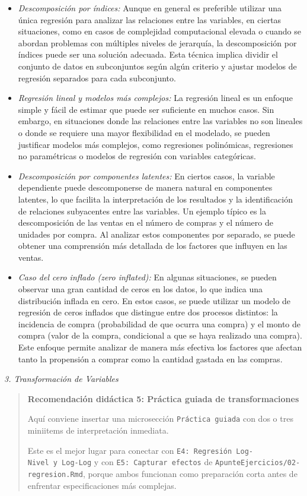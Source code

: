 \documentclass[
]{book}
\begin{document}
\begin{itemize}
\item
  \emph{Descomposición por índices:} Aunque en general es preferible
  utilizar una única regresión para analizar las relaciones entre las
  variables, en ciertas situaciones, como en casos de complejidad
  computacional elevada o cuando se abordan problemas con múltiples
  niveles de jerarquía, la descomposición por índices puede ser una
  solución adecuada. Esta técnica implica dividir el conjunto de datos
  en subconjuntos según algún criterio y ajustar modelos de regresión
  separados para cada subconjunto.
\item
  \emph{Regresión lineal y modelos más complejos:} La regresión lineal es
  un enfoque simple y fácil de estimar que puede ser suficiente en
  muchos casos. Sin embargo, en situaciones donde las relaciones entre
  las variables no son lineales o donde se requiere una mayor
  flexibilidad en el modelado, se pueden justificar modelos más
  complejos, como regresiones polinómicas, regresiones no paramétricas
  o modelos de regresión con variables categóricas.
\item
  \emph{Descomposición por componentes latentes:} En ciertos casos, la
  variable dependiente puede descomponerse de manera natural en
  componentes latentes, lo que facilita la interpretación de los
  resultados y la identificación de relaciones subyacentes entre las
  variables. Un ejemplo típico es la descomposición de las ventas en
  el número de compras y el número de unidades por compra. Al analizar
  estos componentes por separado, se puede obtener una comprensión más
  detallada de los factores que influyen en las ventas.
\item
  \emph{Caso del cero inflado (zero inflated):} En algunas situaciones, se
  pueden observar una gran cantidad de ceros en los datos, lo que
  indica una distribución inflada en cero. En estos casos, se puede
  utilizar un modelo de regresión de ceros inflados que distingue
  entre dos procesos distintos: la incidencia de compra (probabilidad
  de que ocurra una compra) y el monto de compra (valor de la compra,
  condicional a que se haya realizado una compra). Este enfoque
  permite analizar de manera más efectiva los factores que afectan
  tanto la propensión a comprar como la cantidad gastada en las
  compras.
\end{itemize}

\emph{3. Transformación de Variables}

\begin{quote}
\textbf{Recomendación didáctica 5: Práctica guiada de transformaciones}

Aquí conviene insertar una microsección \texttt{Práctica\ guiada} con dos o
tres miniitems de interpretación inmediata.

Este es el mejor lugar para conectar con \texttt{E4:\ Regresión\ Log-Nivel\ y\ Log-Log} y con \texttt{E5:\ Capturar\ efectos} de
\texttt{ApunteEjercicios/02-regresion.Rmd}, porque ambos funcionan como
preparación corta antes de enfrentar especificaciones más complejas.
\end{quote}
\end{document}
